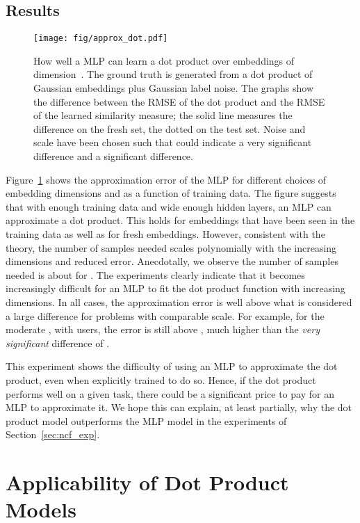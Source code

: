 \documentclass{article}
\begin{document}
\subsection{Results}

\begin{figure}
    \centering
    \texttt{[image: fig/approx\_dot.pdf]}
    \caption{How well a MLP can learn a dot product over embeddings of dimension~.
    The ground truth is generated from a dot product of Gaussian embeddings plus Gaussian label noise.
    The graphs show the difference between the RMSE of the dot product and the RMSE of the learned similarity measure; the solid line measures the difference on the fresh set, the dotted on the test set.
    Noise and scale have been chosen such that  could indicate a very significant difference and  a significant difference.}
    \label{fig:approx_dot}
\end{figure}

Figure~\ref{fig:approx_dot} shows the approximation error of the MLP for different choices of embedding dimensions and as a function of training data.
The figure suggests that with enough training data and wide enough hidden layers, an MLP can approximate a dot product.
This holds for embeddings that have been seen in the training data as well as for fresh embeddings.
However, consistent with the theory, the number of samples needed scales polynomially with the increasing dimensions and reduced error. Anecdotally, we observe the number of samples needed is about  for .
The experiments clearly indicate that it becomes increasingly difficult for an MLP to fit the dot product function with increasing dimensions.
In all cases, the approximation error is well above what is considered a large difference for problems with comparable scale. For example, for the moderate , with  users, the error is still above , much higher than the \emph{very significant} difference of .

This experiment shows the difficulty of using an MLP to approximate the dot product, even when explicitly trained to do so.
Hence, if the dot product performs well on a given task, there could be a significant price to pay for an MLP to approximate it.
We hope this can explain, at least partially, why the dot product model outperforms the MLP model in the experiments of Section~\ref{sec:ncf_exp}.


\section{Applicability of Dot Product Models}
\label{sec:serving}
\end{document}
